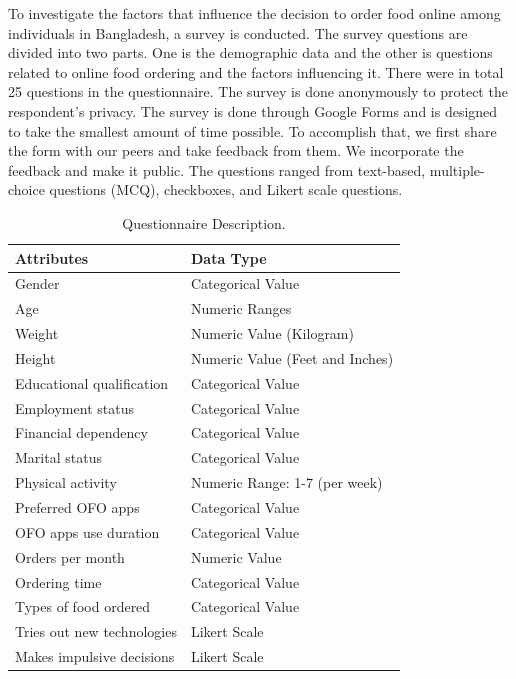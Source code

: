\documentclass[a4paper,fleqn]{cas-sc}
\begin{document}
To investigate the factors that influence the decision to order food online among individuals in Bangladesh, a survey is conducted. The survey questions are divided into two parts. One is the demographic data and the other is questions related to online food ordering and the factors influencing it. There were in total 25 questions in the questionnaire. The survey is done anonymously to protect the respondent's privacy. The survey is done through Google Forms and is designed to take the smallest amount of time possible. To accomplish that, we first share the form with our peers and take feedback from them. We incorporate the feedback and make it public. The questions ranged from text-based, multiple-choice questions (MCQ), checkboxes, and Likert scale questions.

    \begin{table}[width=\linewidth,cols=2,pos=h]
    \caption{Questionnaire Description.}
    \begin{tabular*}{\tblwidth}{@{\extracolsep{\fill}}LL@{}}
    \hline
        Attributes & Data Type \\
        \hline
        Gender & Categorical Value \\
        Age & Numeric Ranges \\
        Weight & Numeric Value (Kilogram) \\
        Height & Numeric Value (Feet and Inches) \\
        Educational qualification & Categorical Value \\
        Employment status & Categorical Value \\
        Financial dependency & Categorical Value \\
        Marital status & Categorical Value \\
        Physical activity & Numeric Range: 1-7 (per week) \\
        Preferred OFO apps & Categorical Value \\
        OFO apps use duration & Categorical Value  \\
        Orders per month & Numeric Value \\
        Ordering time & Categorical Value \\
        Types of food ordered & Categorical Value \\
        Tries out new technologies & Likert Scale \\
        Makes impulsive decisions & Likert Scale\\

\end{tabular*}
\end{table}
\end{document}
